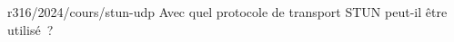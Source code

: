 \begin{question}{r316/2024/cours/stun-udp}
  Avec quel protocole de transport STUN peut-il être utilisé~?
  \begin{reponses}
  \end{reponses}
\end{question}
